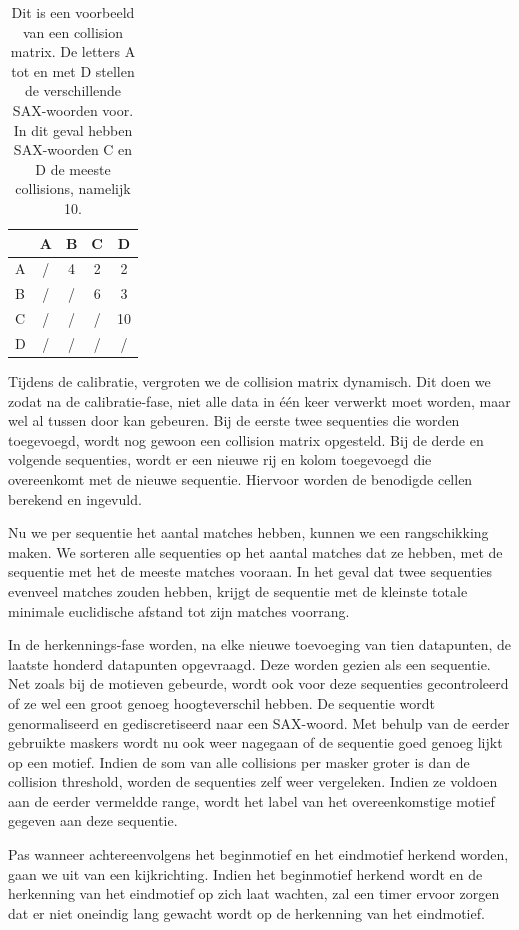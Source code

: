 \documentclass{article}
\begin{document}
\begin{table}
\caption{Dit is een voorbeeld van een collision matrix. De letters A tot en met D stellen de verschillende SAX-woorden voor. In dit geval hebben SAX-woorden C en D de meeste collisions, namelijk 10.}
\centering
\begin{tabular}{ l || c | c | c | c }
& A & B & C & D \\ \hline
\hline
A & / & 4 & 2 & 2 \\ \hline
B & / & / & 6 & 3 \\ \hline
C & / & / & / & 10\\ \hline
D & / & / & / & / \\
\hline
\end{tabular}\par
\end{table}

Tijdens de calibratie, vergroten we de collision matrix dynamisch. Dit doen we zodat na de calibratie-fase, niet alle data in één keer verwerkt moet worden, maar wel al tussen door kan gebeuren. Bij de eerste twee sequenties die worden toegevoegd, wordt nog gewoon een collision matrix opgesteld. Bij de derde en volgende sequenties, wordt er een nieuwe rij en kolom toegevoegd die overeenkomt met de nieuwe sequentie. Hiervoor worden de benodigde cellen berekend en ingevuld.

Nu we per sequentie het aantal matches hebben, kunnen we een rangschikking maken. We sorteren alle sequenties op het aantal matches dat ze hebben, met de sequentie met het de meeste matches vooraan. In het geval dat twee sequenties evenveel matches zouden hebben, krijgt de sequentie met de kleinste totale minimale euclidische afstand tot zijn matches voorrang.

In de herkennings-fase worden, na elke nieuwe toevoeging van tien datapunten, de laatste honderd datapunten opgevraagd. Deze worden gezien als een sequentie. Net zoals bij de motieven gebeurde, wordt ook voor deze sequenties gecontroleerd of ze wel een groot genoeg hoogteverschil hebben. De sequentie wordt genormaliseerd en gediscretiseerd naar een SAX-woord. Met behulp van de eerder gebruikte maskers wordt nu ook weer nagegaan of de sequentie goed genoeg lijkt op een motief. Indien de som van alle collisions per masker groter is dan de collision threshold, worden de sequenties zelf weer vergeleken. Indien ze voldoen aan de eerder vermeldde range, wordt het label van het overeenkomstige motief gegeven aan deze sequentie.

Pas wanneer achtereenvolgens het beginmotief en het eindmotief herkend worden, gaan we uit van een kijkrichting. Indien het beginmotief herkend wordt en de herkenning van het eindmotief op zich laat wachten, zal een timer ervoor zorgen dat er niet oneindig lang gewacht wordt op de herkenning van het eindmotief.
\end{document}
